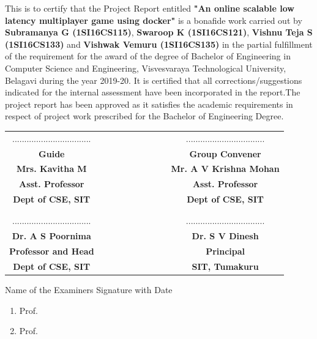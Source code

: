 \begin{large}
This is to certify that the Project Report entitled 
\textbf{"An online scalable low latency multiplayer game using docker"} 
is a bonafide work carried out by 
\textbf{Subramanya G (1SI16CS115)}, 
\textbf{Swaroop K (1SI16CS121)}, 
\textbf{Vishnu Teja S (1SI16CS133)} 
and 
\textbf{Vishwak Vemuru (1SI16CS135)} 
in the partial fulfillment of the requirement for the award of 
the degree of Bachelor of Engineering in Computer Science and Engineering, 
Visvesvaraya Technological University, Belagavi during the year 2019-20. 
It is certified that all corrections/suggestions indicated for the internal 
assessment have been incorporated in the report.The project report has been 
approved as it satisfies the academic requirements in respect of project 
work prescribed for the Bachelor of Engineering Degree.
\end{large}
\vfill
\vfill
\vfill

\begin{table}[h!]
\centering
\begin{tabular}{cccccccccc}
.................................&&&&&&&&& .................................\\
\textbf{{\footnotesize Guide}} &&&&&&&&&\textbf{{\footnotesize Group Convener}}\\
\textbf{Mrs. Kavitha M}&&&&&&&&& \textbf{Mr. A V Krishna Mohan} \\
\textbf{{\footnotesize Asst. Professor}} &&&&&&&&& \textbf{{\footnotesize Asst. Professor}}\\
\textbf{{\footnotesize Dept of CSE, SIT}} &&&&&&&&& \textbf{{\footnotesize Dept of CSE, SIT}}\\
\\
\\
.................................&&&&&&&&& .................................\\
\textbf{Dr. A S Poornima} &&&&&&&&&  \textbf{Dr. S V Dinesh} \\ 
\textbf{{\footnotesize Professor and Head}} &&&&&&&&&  \textbf{{\footnotesize Principal}} \\
\textbf{{\footnotesize Dept of CSE, SIT}} &&&&&&&&&  \textbf{{\footnotesize SIT, Tumakuru}}\\

\end{tabular} 

\end{table}
Name of the Examiners	\hfill	Signature with Date
\begin{small}
\begin{enumerate}
\item Prof.
\item Prof.
\end{enumerate}
\end{small}
